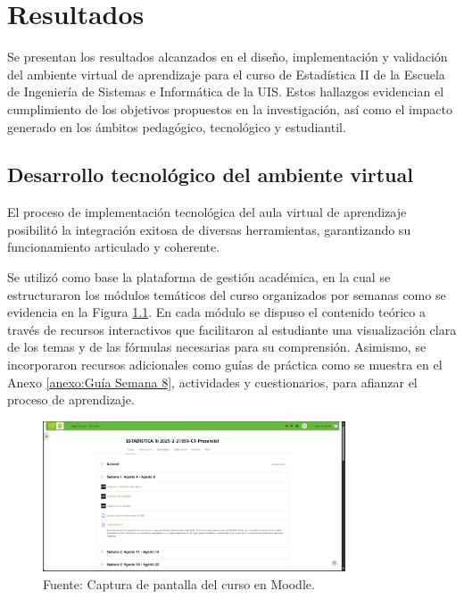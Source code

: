 \documentclass[letter,oneside,12pt,spanish]{report}
\begin{document}
\newpage

\chapter{Resultados}

Se presentan los resultados alcanzados en el diseño, implementación y validación del ambiente virtual de aprendizaje para el curso de Estadística II de la Escuela de Ingeniería de Sistemas e Informática de la UIS. Estos hallazgos evidencian el cumplimiento de los objetivos propuestos en la investigación, así como el impacto generado en los ámbitos pedagógico, tecnológico y estudiantil.

\section{Desarrollo tecnológico del ambiente virtual}

El proceso de implementación tecnológica del aula virtual de aprendizaje posibilitó la integración exitosa de diversas herramientas, garantizando su funcionamiento articulado y coherente.

Se utilizó como base la plataforma de gestión académica, en la cual se estructuraron los módulos temáticos del curso organizados por semanas como se evidencia en la Figura \ref{fig:Moodle}. En cada módulo se dispuso el contenido teórico a través de recursos interactivos que facilitaron al estudiante una visualización clara de los temas y de las fórmulas necesarias para su comprensión. Asimismo, se incorporaron recursos adicionales como guías de práctica como se muestra en el Anexo \ref{anexo:Guía Semana 8}, actividades y cuestionarios, para afianzar el proceso de aprendizaje. 

\begin{figure}[ht]
	\centering
	\includegraphics[width=0.8\textwidth]{Figs/Moodle.pdf}
	\label{fig:Moodle}
	\\Fuente: Captura de pantalla del curso en Moodle.
\end{figure}
\end{document}
